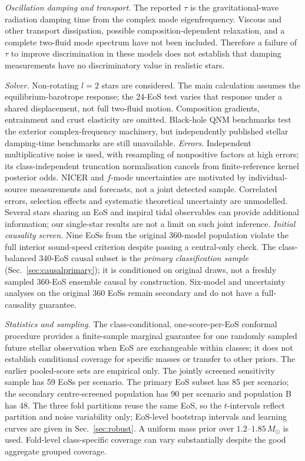 \documentclass[11pt,a4paper]{article}
\newcommand{\Msun}{M_\odot}
\begin{document}
\emph{Oscillation damping and transport.} The reported $\tau$ is the gravitational-wave radiation damping time from the complex mode eigenfrequency. Viscous and other transport dissipation, possible composition-dependent relaxation, and a complete two-fluid mode spectrum have not been included. Therefore a failure of $\tau$ to improve discrimination in these models does not establish that damping measurements have no discriminatory value in realistic stars. \par
\emph{Solver.} Non-rotating $l=2$ stars are considered. The main calculation assumes the equilibrium-barotrope response; the 24-EoS test varies that response under a shared displacement, not full two-fluid motion. Composition gradients, entrainment and crust elasticity are omitted. Black-hole QNM benchmarks test the exterior complex-frequency machinery, but independently published stellar damping-time benchmarks are still unavailable.
\emph{Errors.} Independent multiplicative noise is used, with resampling of nonpositive factors at high errors; its class-independent truncation normalisation cancels from finite-reference kernel posterior odds. NICER and $f$-mode uncertainties are motivated by individual-source measurements and forecasts, not a joint detected sample. Correlated errors, selection effects and systematic theoretical uncertainty are unmodelled. Several stars sharing an EoS and inspiral tidal observables can provide additional information; our single-star results are not a limit on such joint inference.
\emph{Initial causality screen.} Nine EoSs from the original 360-model population violate the full interior sound-speed criterion despite passing a central-only check. The class-balanced 340-EoS causal subset is the \emph{primary classification sample} (Sec.~\ref{sec:causalprimary}); it is conditioned on original draws, not a freshly sampled 360-EoS ensemble causal by construction. Six-model and uncertainty analyses on the original 360 EoSs remain secondary and do not have a full-causality guarantee.\par
\emph{Statistics and sampling.} The class-conditional, one-score-per-EoS conformal procedure provides a finite-sample marginal guarantee for one randomly sampled future stellar observation when EoS are exchangeable within classes; it does not establish conditional coverage for specific masses or transfer to other priors. The earlier pooled-score sets are empirical only. The jointly screened sensitivity sample has 59 EoSs per scenario. The primary EoS subset has 85 per scenario; the secondary centre-screened population has 90 per scenario and population B has 48. The three fold partitions reuse the same EoS, so the $t$-intervals reflect partition and noise variability only; EoS-level bootstrap intervals and learning curves are given in Sec.~\ref{sec:robust}. A uniform mass prior over $1.2$--$1.85\,\Msun$ is used. Fold-level class-specific coverage can vary substantially despite the good aggregate grouped coverage.
\end{document}
